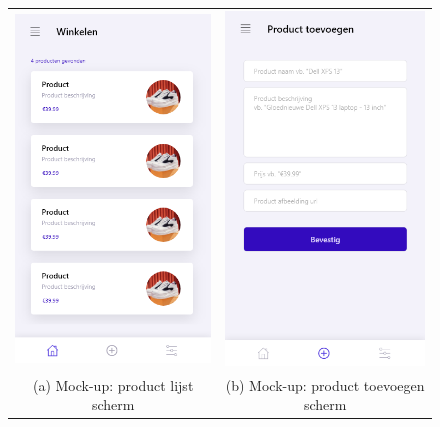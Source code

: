 \begin{figure}
    \begin{tabular}{cc}
        \includegraphics[width=65mm]{img/methodologie/mock-home_screen.png} &   \includegraphics[width=65mm]{img/methodologie/mock-add_product_screen.png} \\
        (a) Mock-up: product lijst scherm & (b) Mock-up: product toevoegen scherm\\[6pt]

\end{tabular}
\end{figure}
